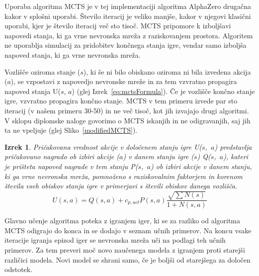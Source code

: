 \documentclass[a4paper, 12pt]{book}
\newtheorem{izrek}{Izrek}[chapter]
\begin{document}
{Uporaba algoritma MCTS je v tej implementaciji algoritma AlphaZero drugačna kakor v splošni uporabi.
Število iteracij je veliko manjše, kakor v njegovi klasični uporabi, kjer je število iteracij več sto tisoč. 
MCTS pripomore k izboljšavi napovedi stanja, ki ga vrne nevronska mreža z raziskovanjem prostora.
Algoritem ne uporablja simulacij za pridobitev končnega stanja igre, vendar samo izboljša napoved stanja, ki ga vrne nevronska mreža.

Vozlišče oziroma stanje ($s$), ki še ni bilo obiskano oziroma ni bila izvedena akcija ($a$), se vzpostavi z napovedjo nevronske mreže in za tem vzvratno propagira napoved stanja U($s$, $a$) (glej Izrek~{\ref{eq:mctsFormula}}).
Če je vozlišče končno stanje igre, vzvratno propagira končno stanje.
MCTS v tem primeru izvede par sto iteracij (v našem primeru 30-50) in ne več tisoč, kot jih izvajajo drugi algoritmi.
V sklopu diplomske naloge govorimo o MCTS iskanjih in ne odigravanjih, saj jih ta ne vpeljuje (glej Sliko~\ref{modifiedMCTS}).

\begin{izrek}
	\label{iz:1}
	Pričakovana vrednost akcije v določenem stanju igre U($s$,~$a$) predstavlja pričakovano nagrado ob izbiri akcije ($a$) v danem stanju igre ($s$) Q($s$,~$a$), kateri je prišteta napoved nagrade v tem stanju P($s$,~$a$) ob izbiri akcije v danem stanju, ki ga vrne nevronska mreža, pomnoženo s raziskovalnim faktorjem in korenom števila vseh obiskov stanja igre v primerjavi s števili obiskov danega vozlišča.
	\begin{equation}
	U(s, a) = Q(s, a) + c_{p,uct}P(s, a)\dfrac{\sqrt{\sum{N(s)}}}{1+N(s, a)}
	\label{eq:mctsFormula}
	\end{equation}
\end{izrek}
\noindent
Glavno učenje algoritma poteka z igranjem iger, ki se za razliko od algoritma MCTS odigrajo do konca in se dodajo v seznam učnih primerov.
Na koncu vsake iteracije igranja epizod iger se nevronska mreža uči na podlagi teh učnih primerov.
Za tem preveri moč novo naučenega modela z igranjem proti starejši različici modela.
Novi model se shrani samo, če je boljši od starejšega za določen odstotek.


}
\end{document}
